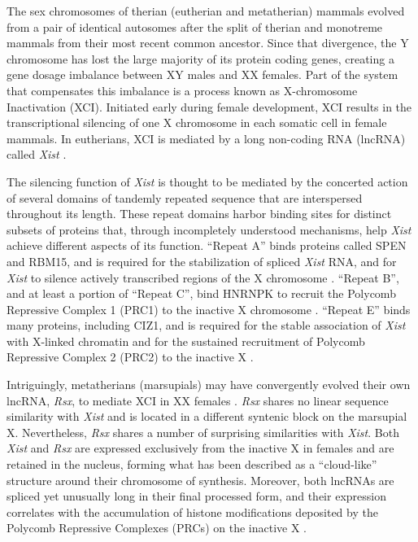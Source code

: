 The sex chromosomes of therian (eutherian and metatherian) mammals evolved from a pair of identical autosomes after the split of therian and monotreme mammals from their most recent common ancestor. Since that divergence, the Y chromosome has lost the large majority of its protein coding genes, creating a gene dosage imbalance between XY males and XX females. Part of the system that compensates this imbalance is a process known as X-chromosome Inactivation (XCI). Initiated early during female development, XCI results in the transcriptional silencing of one X chromosome in each somatic cell in female mammals. In eutherians, XCI is mediated by a long non-coding RNA (lncRNA) called \textit{\emph{Xist}} \cite{Balaton2018TheChromosome,Brockdorff2018LocalNcRNA,DaRocha2017NovelConformation,Sahakyan2018TheCompensation}. 

The silencing function of \textit{\emph{Xist}} is thought to be mediated by the concerted action of several domains of tandemly repeated sequence that are interspersed throughout its length. These repeat domains harbor binding sites for distinct subsets of proteins that, through incompletely understood mechanisms, help \textit{\emph{Xist}} achieve different aspects of its function. “Repeat A” binds proteins called SPEN and RBM15, and is required for the stabilization of spliced \textit{\emph{Xist}} RNA, and for \emph{Xist} to silence actively transcribed regions of the X chromosome \cite{Chu2015SystematicProteins,Engreitz2013TheChromosome, Hoki2009AMouse,McHugh2015TheHDAC3, Moindrot2015ASilencing, Patil2016M6Repression,Royce-Tolland2010TheInactivation,Wutz2002ChromosomalRNA}. “Repeat B”, and at least a portion of “Repeat C”, bind HNRNPK to recruit the Polycomb Repressive Complex 1 (PRC1) to the inactive X chromosome \cite{Almeida2017PCGF3/5-PRC1Inactivation,Pintacuda2017HnRNPKSilencing}. “Repeat E” binds many proteins, including CIZ1, and is required for the stable association of \emph{Xist} with X-linked chromatin and for the sustained recruitment of Polycomb Repressive Complex 2 (PRC2) to the inactive X  \cite{Ridings-Figueroa2017TheTerritory,Smola2016SHAPECells,Sunwoo2017RepeatCIZ1}.

Intriguingly, metatherians (marsupials) may have convergently evolved their own lncRNA, \emph{Rsx}, to mediate XCI in XX females \cite{Grant2012RsxInactivation}. \emph{Rsx} shares no linear sequence similarity with \textit{\emph{Xist}} and is located in a different syntenic block on the marsupial X. Nevertheless, \emph{Rsx} shares a number of surprising similarities with \emph{Xist}. Both \emph{Xist} and \emph{Rsx} are expressed exclusively from the inactive X in females and are retained in the nucleus, forming what has been described as a “cloud-like” structure around their chromosome of synthesis. Moreover, both lncRNAs are spliced yet unusually long in their final processed form, and their expression correlates with the accumulation of histone modifications deposited by the Polycomb Repressive Complexes (PRCs) on the inactive X \cite{Grant2012RsxInactivation}. 

